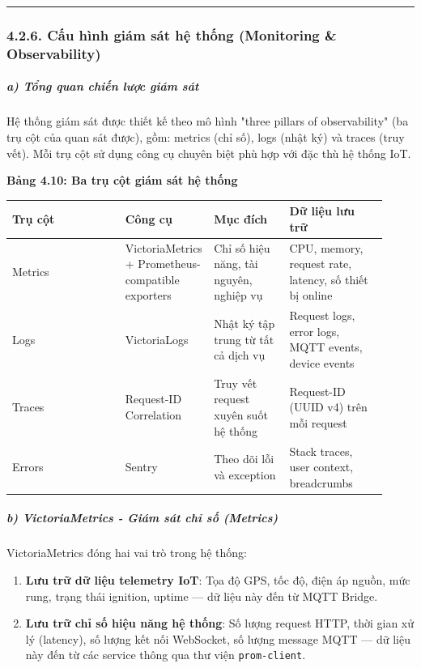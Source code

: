 \documentclass[13pt,a4paper]{extarticle}
\newcounter{none} %
\newcommand{\thesislongtableorignewline}{}
\let\thesislongtableorignewline\\
\renewcommand{\\}{\thesislongtableorignewline\hline}%
\let\\\thesislongtableorignewline
\newcommand{\thesistabletitle}[1]{%
  \begin{center}\textbf{#1}\end{center}%
}
\providecommand{\tightlist}{%
  \setlength{\itemsep}{0pt}\setlength{\parskip}{0pt}}
\begin{document}
\begin{center}\rule{0.5\linewidth}{0.5pt}\end{center}

\subsubsection{4.2.6. Cấu hình giám sát hệ thống (Monitoring \&
Observability)}\label{426-cux1ea5u-huxecnh-giuxe1m-suxe1t-hux1ec7-thux1ed1ng-monitoring--observability}

\subparagraph{a) Tổng quan chiến lược giám
sát}\label{a-tux1ed5ng-quan-chiux1ebfn-lux1b0ux1ee3c-giuxe1m-suxe1t}

Hệ thống giám sát được thiết kế theo mô hình "three pillars of
observability" (ba trụ cột của quan sát được), gồm: metrics (chỉ số),
logs (nhật ký) và traces (truy vết). Mỗi trụ cột sử dụng công cụ chuyên
biệt phù hợp với đặc thù hệ thống IoT.

\thesistabletitle{Bảng 4.10: Ba trụ cột giám sát hệ thống}

{\def\LTcaptype{none} %
\begin{longtable}{|p{0.30\linewidth}|p{0.16\linewidth}|p{0.20\linewidth}|p{0.26\linewidth}|}
\hline \textbf{Trụ cột} & \textbf{Công cụ} & \textbf{Mục đích} & \textbf{Dữ liệu lưu trữ} \\
\hline
\endhead
\hline
\endlastfoot
Metrics & VictoriaMetrics + Prometheus-compatible exporters & Chỉ số
hiệu năng, tài nguyên, nghiệp vụ & CPU, memory, request rate, latency,
số thiết bị online \\
Logs & VictoriaLogs & Nhật ký tập trung từ tất cả dịch vụ & Request
logs, error logs, MQTT events, device events \\
Traces & Request-ID Correlation & Truy vết request xuyên suốt hệ thống &
Request-ID (UUID v4) trên mỗi request \\
Errors & Sentry & Theo dõi lỗi và exception & Stack traces, user
context, breadcrumbs \\
\end{longtable}
}

\subparagraph{b) VictoriaMetrics - Giám sát chỉ số
(Metrics)}\label{b-victoriametrics---giuxe1m-suxe1t-chux1ec9-sux1ed1-metrics}

VictoriaMetrics đóng hai vai trò trong hệ thống:

\begin{enumerate}
\def\labelenumi{\arabic{enumi}.}
\tightlist
\item
  \textbf{Lưu trữ dữ liệu telemetry IoT}: Tọa độ GPS, tốc độ, điện áp
  nguồn, mức rung, trạng thái ignition, uptime --- dữ liệu này đến từ
  MQTT Bridge.
\item
  \textbf{Lưu trữ chỉ số hiệu năng hệ thống}: Số lượng request HTTP,
  thời gian xử lý (latency), số lượng kết nối WebSocket, số lượng
  message MQTT --- dữ liệu này đến từ các service thông qua thư viện
  \texttt{prom-client}.
\end{enumerate}
\end{document}
